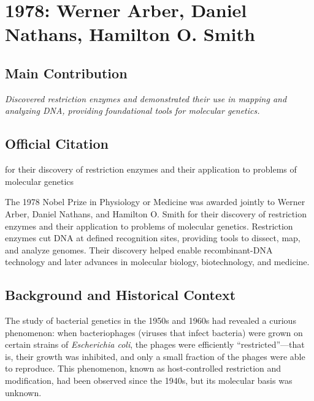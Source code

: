 \chapter[1978 --- Arber, Nathans, and Smith]{1978: Werner Arber, Daniel Nathans, Hamilton O. Smith}
\label{ch:1978_Arber}

\section*{Main Contribution}

\textit{Discovered restriction enzymes and demonstrated their use in mapping and analyzing DNA, providing foundational tools for molecular genetics.}\cite{nobel-1978,lecture-1978,lecture-nathans-1978,lecture-smith-1978}

\section{Official Citation}

for their discovery of restriction enzymes and their application to problems of molecular genetics

The 1978 Nobel Prize in Physiology or Medicine was awarded jointly to Werner Arber, Daniel Nathans, and Hamilton O. Smith for their discovery of restriction enzymes and their application to problems of molecular genetics. Restriction enzymes cut DNA at defined recognition sites, providing tools to dissect, map, and analyze genomes. Their discovery helped enable recombinant-DNA technology and later advances in molecular biology, biotechnology, and medicine.

\section{Background and Historical Context}

The study of bacterial genetics in the 1950s and 1960s had revealed a curious phenomenon: when bacteriophages (viruses that infect bacteria) were grown on certain strains of \emph{Escherichia coli}, the phages were efficiently ``restricted''---that is, their growth was inhibited, and only a small fraction of the phages were able to reproduce. This phenomenon, known as host-controlled restriction and modification, had been observed since the 1940s, but its molecular basis was unknown.


